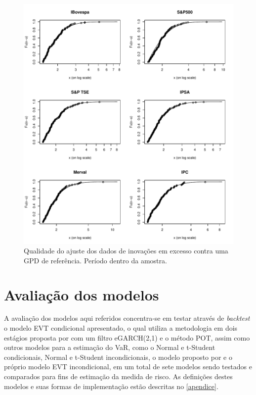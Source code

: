 \documentclass[review]{elsarticle}
\theoremstyle{definition}
\begin{document}
\begin{figure}[H]
	\centering
	\includegraphics[width=1\linewidth]{figs/artigo-gpdfit}
	\caption{Qualidade do ajuste dos dados de inovações em excesso contra uma GPD de referência. Período dentro da amostra.}
	\label{fig:artigo-gpdfit}
\end{figure}

\section{Avaliação dos modelos}
\label{sec:avaliacao}

A avaliação dos modelos aqui referidos concentra-se em testar através de \emph{backtest} o modelo EVT condicional apresentado, o qual utiliza a metodologia em dois estágios proposta por \cite{McNeil2000} com um filtro eGARCH(2,1) e o método POT, assim como outros modelos para a estimação do VaR, como o Normal e t-Student condicionais, Normal e t-Student incondicionais, o modelo proposto por \cite{RiskMetrics1995} e o próprio modelo EVT incondicional, em um total de sete modelos sendo testados e comparados para fins de estimação da medida de risco. As definições destes modelos e suas formas de implementação estão descritas no \ref{apendice}.
\end{document}
